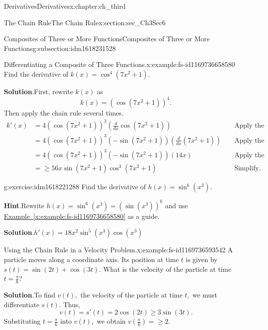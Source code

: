 \documentclass[oneside,10pt,]{book}
\newcommand{\blocktitlefont}{\relax}
\newcommand{\xreffont}{\relax}
\numberwithin{equation}{section}
\newcommand{\amp}{&}
\begin{document}
\begin{chapterptx}{Derivatives}{}{Derivatives}{}{}{x:chapter:ch_third}
\begin{sectionptx}{The Chain Rule}{}{The Chain Rule}{}{}{x:section:sec_Ch3Sec6}
\begin{subsectionptx}{Composites of Three or More Functions}{}{Composites of Three or More Functions}{}{}{g:subsection:idm1618231528}
\begin{example}{Differentiating a Composite of Three Functions.}{x:example:fs-id1169736658580}%
Find the derivative of \(k(x)=\cos^4(7x^2+1).\)%
\par\smallskip%
\noindent\textbf{\blocktitlefont Solution}.\hypertarget{g:solution:idm1618222568}{}\quad{}First, rewrite \(k(x)\) as%
%
\begin{equation*}
k(x)=(\cos (7x^2+1))^4.
\end{equation*}
Then apply the chain rule several times.%
%
\begin{align*}
k'(x)\amp=4(\cos (7x^2+1))^3(\frac{d}{dx}\cos (7x^2+1))\amp\amp\text{ Apply the chain rule. }\\
\amp=4(\cos (7x^2+1))^3(-\sin (7x^2+1))(\frac{d}{dx}(7x^2+1))\amp\amp\text{ Apply the chain rule. }\\
\amp=4(\cos (7x^2+1))^3(-\sin (7x^2+1))(14x)\amp\amp\text{ Apply the chain rule. }\\
\amp=\geq 56x \sin (7x^2+1)\cos^3(7x^2+1)\amp\amp\text{ Simplify. }
\end{align*}
\end{example}
\begin{inlineexercise}{}{g:exercise:idm1618221288}%
Find the derivative of \(h(x)=\sin^6(x^3).\)%
\par\smallskip%
\noindent\textbf{\blocktitlefont Hint}.\hypertarget{g:hint:idm1618218856}{}\quad{}Rewrite \(h(x)=\sin^6(x^3)=(\sin(x^3))^6\) and use \hyperref[x:example:fs-id1169736658580]{Example~{\xreffont\ref{x:example:fs-id1169736658580}}} as a guide.%
\par\smallskip%
\noindent\textbf{\blocktitlefont Solution}.\hypertarget{g:solution:idm1618216168}{}\quad{}\(h'(x)=18x^2\sin^5(x^3) \cos (x^3)\)%
\end{inlineexercise}%
\begin{example}{Using the Chain Rule in a Velocity Problem.}{x:example:fs-id1169736593542}%
A particle moves along a coordinate axis. Its position at time \(t\) is given by \(s(t)=\sin (2t)+\cos (3t).\) What is the velocity of the particle at time \(t=\frac{\pi}{6}?\)%
\par\smallskip%
\noindent\textbf{\blocktitlefont Solution}.\hypertarget{g:solution:idm1618214120}{}\quad{}To find \(v(t),\) the velocity of the particle at time \(t,\) we must differentiate \(s(t).\) Thus,%
%
\begin{equation*}
v(t)=s'(t)=2 \cos (2t)\geq 3 \sin (3t).
\end{equation*}
Substituting \(t=\frac{\pi}{6}\) into \(v(t),\) we obtain \(v(\frac{\pi}{6})=\geq 2.\)%

\end{example}
\end{subsectionptx}
\end{sectionptx}
\end{chapterptx}
\end{document}
